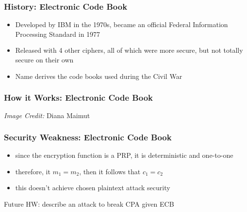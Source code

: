 \documentclass{beamer}
\begin{document}
\begin{frame}
    \frametitle{History: Electronic Code Book}
    \begin{itemize}
        \item \pause Developed by IBM in the 1970s, became an official Federal Information Processing Standard in 1977 \pause
        \item Released with 4 other ciphers, all of which were more secure, but not totally secure on their own \pause
        \item Name derives the code books used during the Civil War \pause
    \end{itemize}

\end{frame}

\begin{frame}
    \frametitle{How it Works: Electronic Code Book}

    \vfill
    \textit{Image Credit: }Diana Maimut
\end{frame}

\begin{frame}
    \frametitle{Security Weakness: Electronic Code Book}
    \begin{itemize}
        \item \pause since the encryption function is a PRP, it is deterministic and one-to-one \pause
        \item therefore, it \(m_1 = m_2\), then it follows that \(c_1 = c_2\) \pause
        \item this doesn't achieve chosen plaintext attack security\pause
    \end{itemize}
        Future HW: describe an attack to break CPA given ECB
\end{frame}
\end{document}
